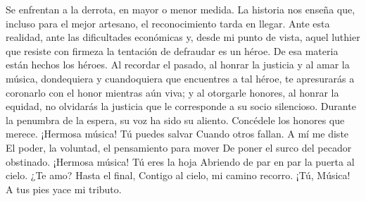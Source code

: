Se enfrentan a la derrota, en mayor o menor medida. La historia nos enseña que, incluso para el mejor artesano, el reconocimiento tarda en llegar. Ante esta realidad, ante las dificultades económicas y, desde mi punto de vista, aquel luthier que resiste con firmeza la tentación de defraudar es un héroe.
De esa materia están hechos los héroes.
Al recordar el pasado, al honrar la justicia y al amar la música, dondequiera y cuandoquiera que encuentres a tal héroe, te apresurarás a coronarlo con el honor mientras aún viva; y al otorgarle honores, al honrar la equidad, no olvidarás la justicia que le corresponde a su socio silencioso. Durante la penumbra de la espera, su voz ha sido su aliento. Concédele los honores que merece.
¡Hermosa música! Tú puedes salvar Cuando otros fallan. A mí me diste El poder, la voluntad, el pensamiento para mover De poner el surco del pecador obstinado. ¡Hermosa música! Tú eres la hoja Abriendo de par en par la puerta al cielo. ¿Te amo? Hasta el final,
Contigo al cielo, mi camino recorro. ¡Tú, Música! A tus pies yace mi tributo.
